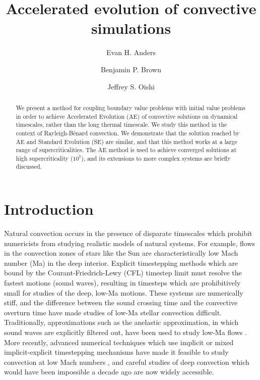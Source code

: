 \documentclass[aps, pre, onecolumn, nofootinbib, notitlepage, groupedaddress, amsfonts, amssymb, amsmath, longbibliography]{revtex4-1}
\newcommand{\RB}{Rayleigh-B\'{e}nard }
\begin{document}
\author{Evan H. Anders}
\author{Benjamin P. Brown}
\author{Jeffrey S. Oishi}
\title{Accelerated evolution of convective simulations}

\begin{abstract}
We present a method for coupling boundary value problems with initial value problems 
in order to achieve Accelerated Evolution (AE) of convective solutions on
dynamical timescales, rather than the long thermal timescale. 
We study this method in the context of \RB convection. 
We demonstrate that the solution reached by AE and Standard Evolution (SE) are
similar, and that this method works at a
large range of supercriticalities.  The AE method is used to achieve converged 
solutions at high supercriticality ($10^7$), and its extensions to more complex 
systems are briefly discussed.
\end{abstract}
\maketitle


\section{Introduction}
\label{sec:intro}
Natural convection occurs in the presence of disparate timescales which
prohibit numericists from studying realistic models of natural systems.  For example,
flows in the convection zones of stars like the Sun are characteristically low Mach number
(Ma) in the deep interior.
Explicit timestepping methods which are bound by the Courant-Friedrich-Lewy
(CFL) timestep limit must resolve the fastest motions (sound
waves), resulting in timesteps which are prohibitively
small for studies of the deep, low-Ma motions. These systems are numerically
stiff, and the difference between
the sound crossing time and the convective overturn time have made studies of low-Ma stellar
convection difficult. Traditionally, approximations such as
the anelastic approximation, in which sound waves are explicitly filtered out,
have been used to study low-Ma flows \cite{brown&all2010, featherstone&hindman2016}.
More recently, advanced numerical techniques which use implicit or mixed
implicit-explicit timestepping mechanisms have made it feasible to study
convection at low Mach numbers \cite{viallet&all2011, viallet&all2013, viallet&all2016, lecoanet&all2014,
anders&brown2017, bordwell&all2018}, and careful studies of deep convection which
would have been impossible a decade ago are now widely accessible.
\end{document}
